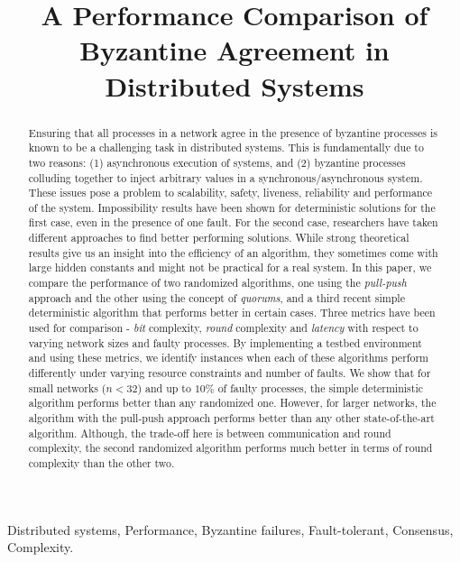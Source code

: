 \title{A Performance Comparison of Byzantine Agreement in Distributed Systems}


%

\maketitle

\begin{abstract}

Ensuring that all processes in a network agree in the
presence of byzantine processes is known to be a challenging task in
distributed systems. This is fundamentally due to two reasons: (1)
asynchronous execution of systems, and (2) byzantine
processes colluding together to inject arbitrary values in a synchronous/asynchronous
system. These issues pose a problem to scalability, safety, liveness,
reliability and performance of the system. Impossibility results have
been shown for deterministic solutions for the first case, even in the
presence of one fault. For the second case, researchers have taken
different approaches to find better performing solutions. While strong
theoretical results give us an insight into the efficiency of an
algorithm, they sometimes come with large hidden constants and might not
be practical for a real system. In this paper, we compare the 
performance of two randomized algorithms, one using the {\em pull-push} approach
and the other using the concept of {\em quorums}, and a third recent simple
deterministic algorithm that performs
better in certain cases.
Three metrics have been used for comparison - {\em bit}
complexity, {\em round} complexity and {\em latency} with respect to varying network sizes and
faulty processes. By implementing a testbed environment and using these metrics, we identify instances when each of these
algorithms perform differently under varying resource constraints and
number of faults. We show that for small networks ($n<32$) and up to $10\%$ of faulty processes, the simple deterministic algorithm performs better than any randomized one. However, for larger networks, the algorithm with the pull-push approach performs better than any other state-of-the-art algorithm. Although, the trade-off here is between communication and round complexity, the second randomized algorithm performs much better in terms of round complexity than the other two. 

\end{abstract}

 Distributed systems, Performance, Byzantine failures, Fault-tolerant, Consensus, Complexity.
